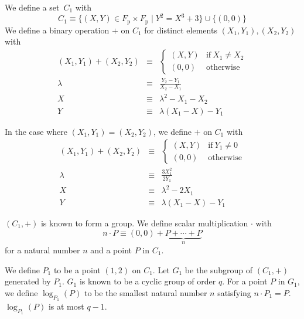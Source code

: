 \documentclass[9pt,oneside]{amsart}
\begin{document}
We define a set~$C_1$ with
\begin{equation}
C_1\equiv\{(X,Y)\in F_{\mathrm{p}}\times F_{\mathrm{p}}\mid Y^2=X^3+3\}\cup\{(0,0)\}
\end{equation}
We define a binary operation $+$ on $C_1$ for distinct elements $(X_1, Y_1), (X_2, Y_2)$ with
\begin{eqnarray}\label{eq:ec-addition}
(X_1, Y_1) + (X_2, Y_2)&\equiv&\begin{cases}
(X,Y)&\text{if}\ X_1\neq X_2\\
(0,0)&\text{otherwise}
\end{cases}\\
\nonumber \lambda&\equiv&\frac{Y_2-Y_1}{X_2-X_1}\\
\nonumber X&\equiv&\lambda^2-X_1-X_2\\
\nonumber Y&\equiv&\lambda(X_1-X)-Y_1
\end{eqnarray}

In the case where $(X_1, Y_1) = (X_2, Y_2)$, we define $+$ on $C_1$ with
\begin{eqnarray}\label{eq:ec-doubling}
(X_1, Y_1) + (X_2, Y_2)&\equiv&\begin{cases}
(X,Y)&\text{if}\ Y_1\neq 0\\
(0,0)&\text{otherwise}
\end{cases}\\
\nonumber \lambda&\equiv&\frac{3X_1^2}{2Y_1}\\
\nonumber X&\equiv&\lambda^2-2X_1\\
\nonumber Y&\equiv&\lambda(X_1-X)-Y_1
\end{eqnarray}

$(C_1,+)$ is known to form a group. We define scalar multiplication $\cdot$ with
\begin{equation}\label{eq:ec-scalar-multiplication}
n\cdot P\equiv(0,0)+\underbrace{P+\cdots+P}_{n}
\end{equation}
for a natural number $n$ and a point $P$ in $C_1$.

We define $P_1$ to be a point $(1,2)$ on $C_1$. Let $G_1$ be the subgroup of $(C_1,+)$ generated by $P_1$. $G_1$ is known to be a cyclic group of order $q$. For a point $P$ in $G_1$, we define $\log_{P_1}(P)$ to be the smallest natural number $n$ satisfying $n\cdot P_1=P$. $\log_{P_1}(P)$ is at most $q-1$.
\end{document}
